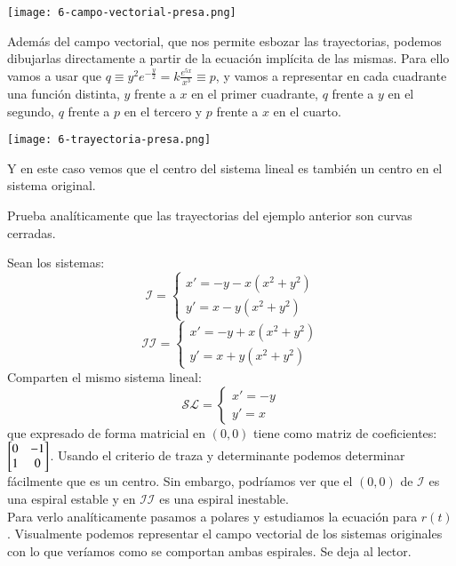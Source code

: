 \begin{eg}
    \begin{center}
        \texttt{[image: 6-campo-vectorial-presa.png]}
    \end{center}
    Además del campo vectorial, que nos permite esbozar las trayectorias, podemos dibujarlas directamente a partir de la ecuación implícita de las mismas. Para ello vamos a usar que $ q \equiv y^2 e^{-\frac{y}{2}} = k \frac{e^{5x}}{x^3} \equiv p$, y vamos a representar en cada cuadrante una función distinta, $y$ frente a $x$ en el primer cuadrante, $q$ frente a $y$ en el segundo, $q$ frente a $p$ en el tercero y $p$ frente a $x$ en el cuarto.
    \begin{center}
        \texttt{[image: 6-trayectoria-presa.png]}
    \end{center}
    Y en este caso vemos que el centro del sistema lineal es también un centro en el sistema original.
\end{eg}
\begin{th_ex}
    Prueba analíticamente que las trayectorias del ejemplo anterior son curvas cerradas.
\end{th_ex}
\pagebreak
\begin{eg}\label{eg:centr-esp}
    Sean los sistemas:
    $$
        \mathcal{I} =
        \begin{cases}
                x' = -y -x(x^2 + y^2)\\
                y' = x  - y(x^2 + y^2)
        \end{cases}
    $$
    $$
        \mathcal{II} =
        \begin{cases}
                x' = -y + x(x^2 + y^2)\\
                y' = x  + y(x^2 + y^2)
        \end{cases}
    $$
    Comparten el mismo sistema lineal:
    $$
        \mathcal{SL} =
        \begin{cases}
                x' = -y\\
                y' = x
        \end{cases}
    $$
    que expresado de forma matricial en $(0, 0)$ tiene como matriz de coeficientes: $\mx{0 & -1 \\ 1 & 0}$. Usando el criterio de traza y determinante podemos determinar fácilmente que es un centro. Sin embargo, podríamos ver que el $(0,0)$ de $\mathcal{I}$ es una espiral estable y en $\mathcal{II}$ es una espiral inestable.\\
    Para verlo analíticamente pasamos a polares y estudiamos la ecuación para $r(t)$. Visualmente podemos representar el campo vectorial de los sistemas originales con lo que veríamos como se comportan ambas espirales. Se deja al lector.
\end{eg}
